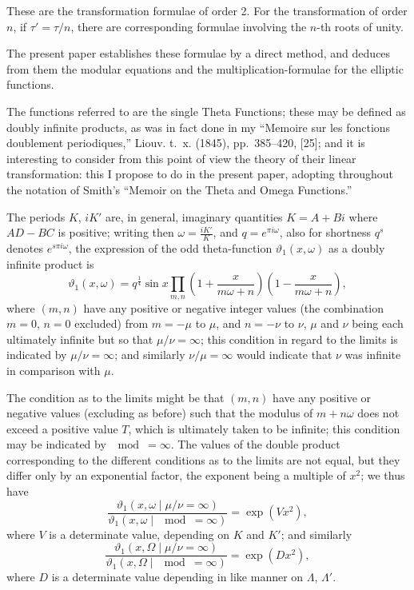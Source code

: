 \documentclass[11pt,a4paper]{article}
\theoremstyle{definition}
\theoremstyle{remark}
\begin{document}
These are the transformation formulae of order 2. For the transformation of order $n$, if $\tau' = \tau/n$, there are corresponding formulae involving the $n$-th roots of unity.

The present paper establishes these formulae by a direct method, and deduces from them the modular equations and the multiplication-formulae for the elliptic functions.

The functions referred to are the single Theta Functions; these may be defined as doubly infinite products, as was in fact done in my ``Memoire sur les fonctions doublement periodiques,'' Liouv. t.~x. (1845), pp.~385--420, [25]; and it is interesting to consider from this point of view the theory of their linear transformation: this I propose to do in the present paper, adopting throughout the notation of Smith's ``Memoir on the Theta and Omega Functions.''

The periods $K$, $iK'$ are, in general, imaginary quantities $K = A + Bi$ where $AD - BC$ is positive; writing then $\omega = \frac{iK'}{K}$, and $q = e^{\pi i \omega}$, also for shortness $q^s$ denotes $e^{s \pi i \omega}$, the expression of the odd theta-function $\vartheta_1(x, \omega)$ as a doubly infinite product is
\[
\vartheta_1(x, \omega) = q^{\frac{1}{4}} \sin x \prod_{m,n} \left(1 + \frac{x}{m\omega + n}\right) \left(1 - \frac{x}{m\omega + n}\right),
\]
where $(m, n)$ have any positive or negative integer values (the combination $m = 0$, $n = 0$ excluded) from $m = -\mu$ to $\mu$, and $n = -\nu$ to $\nu$, $\mu$ and $\nu$ being each ultimately infinite but so that $\mu/\nu = \infty$; this condition in regard to the limits is indicated by $\mu/\nu = \infty$; and similarly $\nu/\mu = \infty$ would indicate that $\nu$ was infinite in comparison with $\mu$.

The condition as to the limits might be that $(m, n)$ have any positive or negative values (excluding as before) such that the modulus of $m + n\omega$ does not exceed a positive value $T$, which is ultimately taken to be infinite; this condition may be indicated by $\mod = \infty$. The values of the double product corresponding to the different conditions as to the limits are not equal, but they differ only by an exponential factor, the exponent being a multiple of $x^2$; we thus have
\[
\frac{\vartheta_1(x, \omega \mid \mu/\nu = \infty)}{\vartheta_1(x, \omega \mid \mod = \infty)} = \exp(Vx^2),
\]
where $V$ is a determinate value, depending on $K$ and $K'$; and similarly
\[
\frac{\vartheta_1(x, \Omega \mid \mu/\nu = \infty)}{\vartheta_1(x, \Omega \mid \mod = \infty)} = \exp(Dx^2),
\]
where $D$ is a determinate value depending in like manner on $\Lambda$, $\Lambda'$.
\end{document}
